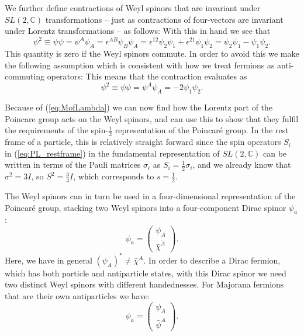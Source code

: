 \documentclass[notes.tex]{subfiles}
\begin{document}
We further define contractions of Weyl spinors that are invariant under $SL(2,\mathbb{C})$ transformations -- just as  contractions of four-vectors are invariant under Lorentz transformations -- as follows:
With this in hand we see that 
\[\psi^2 \equiv \psi \psi = \psi^A\psi_A = \epsilon^{AB}\psi_B\psi_A = \epsilon^{12}\psi_2\psi_1 + \epsilon^{21}\psi_1\psi_2 = \psi_2\psi_1 - \psi_1\psi_2.\]
This quantity is zero if the Weyl spinors commute. In order to avoid this we make the following assumption which is consistent with how we treat fermions as anti-commuting operators:
This means that the contraction evaluates as
\[\psi^2 \equiv \psi \psi = \psi^A\psi_A = -2 \psi_1\psi_2.\]

Because of (\ref{eq:MofLambda}) we can now find how the Lorentz part of the Poincare group acts on the Weyl spinors, and can use this to show that they fulfil the requirements of the spin-$\frac{1}{2}$ representation of the Poincaré group. In the rest frame of a particle, this is relatively straight forward since the spin operators $S_i$ in (\ref{eq:PL_restframe}) in the fundamental representation of $SL(2,\mathbb{C})$ can be written in terms of the Pauli matrices $\sigma_i$ as $S_i=\frac{1}{2}\sigma_i$, and we already know that $\sigma^2=3I$, so $S^2=\frac{3}{4}I$, which corresponds to $s=\frac{1}{2}$.

The Weyl spinors can in turn be used in a four-dimensional representation of the Poincaré group, stacking two Weyl spinors into a four-component Dirac spinor $\psi_a$:
\begin{equation*}
\psi_a = \begin{pmatrix}\psi_A\\ \bar{\chi}^{\dot{A}}\end{pmatrix}.
\end{equation*}
Here, we have in general $(\psi_A)^* \neq \bar{\chi}^{\dot{A}}$. In order to describe a Dirac fermion, which has both particle and antiparticle states, with this Dirac spinor we need two distinct Weyl spinors with different handednesses. For Majorana fermions that are their own antiparticles we have:
\[\psi_a = \begin{pmatrix} \psi_A \\ \bar{\psi}^{\dot{A}}\end{pmatrix}.\]
\end{document}

